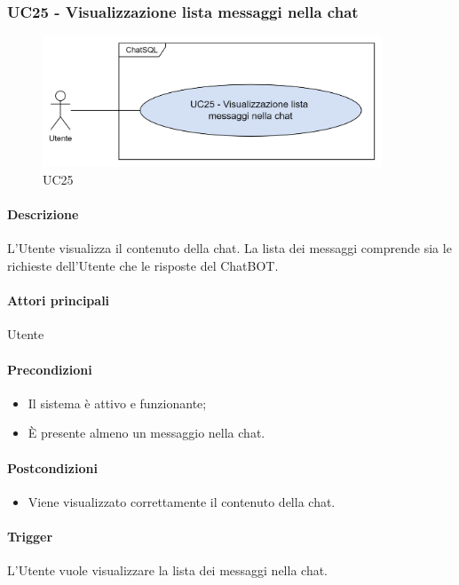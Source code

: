 \subsubsection{UC25 - Visualizzazione lista messaggi nella chat}\label{UC25}

\begin{figure}[H]
  \centering
  \includegraphics[width=0.90\textwidth]{assets/uc25.png}
  \caption{UC25}
\end{figure}


\paragraph*{Descrizione}
L'Utente visualizza il contenuto della chat. La lista dei messaggi comprende sia le richieste dell'Utente che le risposte del ChatBOT.

\paragraph*{Attori principali}
Utente

\paragraph*{Precondizioni}
\begin{itemize}
  \item Il sistema è attivo e funzionante;
  \item È presente almeno un messaggio nella chat.
\end{itemize}

\paragraph*{Postcondizioni}
\begin{itemize}
  \item Viene visualizzato correttamente il contenuto della chat.
\end{itemize}

\paragraph*{Trigger}
L'Utente vuole visualizzare la lista dei messaggi nella chat.

